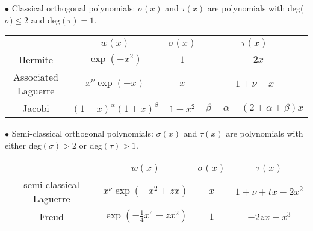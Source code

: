 \documentclass[12pt]{article}
\numberwithin{figure}{section}
\numberwithin{equation}{section}
\numberwithin{table}{section}
\begin{document}
$\bullet$ Classical orthogonal polynomials: $\sigma(x)$ and $\tau(x)$ are polynomials with deg($\sigma)\leq2$
and deg$(\tau) = 1$.
\begin{table}[H]
\centering %
\centering  %
\footnotesize\begin{tabular}{|c|c|c|c|} %
\hline
& $w(x)$ & $\sigma(x)$ & $\tau(x)$\\
\hline
Hermite & $\exp(-x^2)$ & $1$ & $-2x$\\
Associated Laguerre & $x^\nu\exp(-x)$ & $x$ & $1+\nu-x$\\
Jacobi & $(1-x)^\alpha(1+x)^\beta$ & $1-x^2$ & $\beta-\alpha-(2+\alpha+\beta)x$\\
\hline
\end{tabular}
\label{table:nonlin} %
\end{table}
$\bullet$ Semi-classical orthogonal polynomials: $\sigma(x)$ and $\tau(x)$ are polynomials with either deg$(\sigma)>2$
or deg$(\tau)>1$.
\begin{table}[H]
\centering %
\centering  %
\footnotesize\begin{tabular}{|c|c|c|c|} %
\hline
& $w(x)$ & $\sigma(x)$ & $\tau(x)$\\
\hline
semi-classical Laguerre & $x^\nu\exp(-x^2+zx)$ & $x$ & $1+\nu+tx-2x^2$\\
Freud & $\exp(-\tfrac{1}{4}x^4-zx^2)$ & $1$ & $-2zx-x^3$\\
\hline
\end{tabular}
\label{table:nonlin} %
\end{table}
\end{document}
